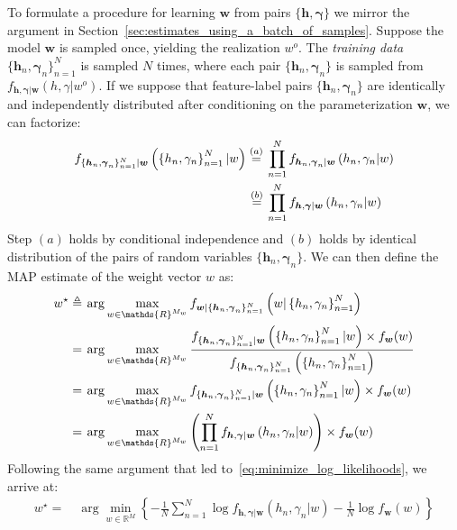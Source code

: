 \documentclass[oneside,11pt]{amsart}
\def\w{{\boldsymbol{w}}}
\theoremstyle{remark}
\begin{document}
To formulate a procedure for learning \( \boldsymbol{w} \) from pairs \( \{ \boldsymbol{h}, \boldsymbol{\gamma} \} \) we mirror the argument in Section~\ref{sec:estimates_using_a_batch_of_samples}. Suppose the model \( \w \) is sampled once, yielding the realization \( w^o \). The \emph{training data} \( \{\boldsymbol{h}_n, \boldsymbol{\gamma}_n\}_{n=1}^N \) is sampled \( N \) times, where each pair \( \{\boldsymbol{h}_n, \boldsymbol{\gamma}_n\} \) is sampled from \( f_{\boldsymbol{h}, \boldsymbol{\gamma} | \boldsymbol{w} } \left( h, {\gamma} | w^o \right) \). If we suppose that feature-label pairs \( \{\boldsymbol{h}_n, \boldsymbol{\gamma}_n\} \) are identically and independently distributed after conditioning on the parameterization \( \w \), we can factorize:
\begin{align}
  f_{\{ \boldsymbol{h}_n, \boldsymbol{\gamma}_n \}_{n=1}^N | \boldsymbol{w} } \left( \left\{ {h}_{n}, \gamma_n \right\}_{n=1}^N | w \right) \stackrel{(a)}{=}&\: \prod_{n=1}^N f_{\boldsymbol{h}_n, \boldsymbol{\gamma}_n | \boldsymbol{w} } \left( {h}_{n}, {\gamma}_n | w\right) \notag \\
  \stackrel{(b)}{=}&\: \prod_{n=1}^N f_{\boldsymbol{h}, \boldsymbol{\gamma} | \boldsymbol{w} } \left( {h}_{n}, {\gamma}_n | w \right)
\end{align}
Step \( (a) \) holds by conditional independence and \( (b) \) holds by identical distribution of the pairs of random variables \( \{ \boldsymbol{h}_n, \boldsymbol{\gamma}_n \}\). We can then define the MAP estimate of the weight vector \( w \) as:
\begin{align}
  w^{\star} \triangleq&\: \arg\max_{w \in \mathds{R}^{M_w}} f_{\boldsymbol{w} | \{ \boldsymbol{h}_n, \boldsymbol{\gamma}_n \}_{n=1}^N} \left( w | \left\{ {h}_{n}, \gamma_n \right\}_{n=1}^N \right) \notag \\
  =&\: \arg\max_{w \in \mathds{R}^{M_w}} \frac{f_{\{ \boldsymbol{h}_n, \boldsymbol{\gamma}_n \}_{n=1}^N | \boldsymbol{w}} \left(  \left\{ {h}_{n}, \gamma_n \right\}_{n=1}^N | w \right) \times f_{\boldsymbol{w}}(w)}{f_{\{ \boldsymbol{h}_n, \boldsymbol{\gamma}_n \}_{n=1}^N} \left(\left\{ {h}_{n}, \gamma_n \right\}_{n=1}^N \right)} \notag \\
  =&\: \arg\max_{w \in \mathds{R}^{M_w}} {f_{\{ \boldsymbol{h}_n, \boldsymbol{\gamma}_n \}_{n=1}^N | \boldsymbol{w}} \left(  \left\{ {h}_{n}, \gamma_n \right\}_{n=1}^N | w \right) \times f_{\boldsymbol{w}}(w)} \notag \\
  =&\: \arg\max_{w \in \mathds{R}^{M_w}} \left( \prod_{n=1}^N f_{\boldsymbol{h}, \boldsymbol{\gamma} | \boldsymbol{w}} \left( {h}_{n}, {\gamma}_n | w \right) \right) \times f_{\boldsymbol{w}}(w)
\end{align}
Following the same argument that led to~\eqref{eq:minimize_log_likelihoods}, we arrive at:
\begin{align}\label{eq:minimize_log_likelihoods_for_learning}
  w^{\star} =&\: \arg\min_{w \in \mathds{R}^M} \left\{ -\frac{1}{N} \sum_{n=1}^N \log f_{\boldsymbol{h}, \boldsymbol{\gamma} | \boldsymbol{w} } \left( {h}_{n}, {\gamma}_n | w \right) - \frac{1}{N} \log f_{\boldsymbol{w}}(w) \right\}
\end{align}
\end{document}
